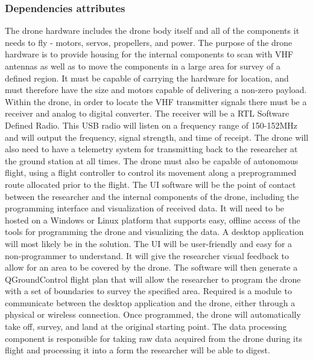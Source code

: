 \documentclass[onecolumn, draftclsnofoot,10pt, compsoc]{IEEEtran}
\begin{document}
\subsubsection{Dependencies attributes}

The drone hardware includes the drone body itself and all of the components it needs to fly - motors, servos, propellers, and power.
The purpose of the drone hardware is to provide housing for the internal components to scan with VHF antennas as well as to move the components in a large area for survey of a defined region.
It must be capable of carrying the hardware for location, and must therefore have the size and motors capable of delivering a non-zero payload.
Within the drone, in order to locate the VHF transmitter signals there must be a receiver and analog to digital converter.
The receiver will be a RTL Software Defined Radio. This USB radio will listen on a frequency range of 150-152MHz and will output the frequency, signal strength, and time of receipt.
The drone will also need to have a telemetry system for transmitting back to the researcher at the ground station at all times.
The drone must also be capable of autonomous flight, using a flight controller to control its movement along a preprogrammed route allocated prior to the flight.
\newline
\newline
The UI software will be the point of contact between the researcher and the internal components of the drone, including the programming interface and visualization of received data.
It will need to be hosted on a Windows or Linux platform that supports easy, offline access of the tools for programming the drone and visualizing the data.
A desktop application will most likely be in the solution.
The UI will be user-friendly and easy for a non-programmer to understand.
It will give the researcher visual feedback to allow for an area to be covered by the drone.
The software will then generate a QGroundControl flight plan that will allow the researcher to program the drone with a set of boundaries to survey the specified area.
Required is a module to communicate between the desktop application and the drone, either through a physical or wireless connection.
Once programmed, the drone will automatically take off, survey, and land at the original starting point.
\newline
\newline
The data processing component is responsible for taking raw data acquired from the drone during its flight and processing it into a form the researcher will be able to digest.
\end{document}
